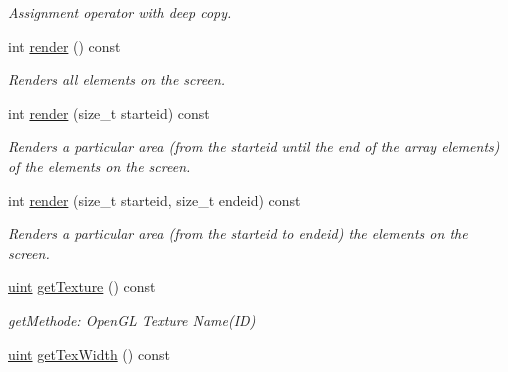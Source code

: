\begin{DoxyCompactItemize}
\begin{DoxyCompactList}\small\item\em Assignment operator with deep copy. \item\end{DoxyCompactList}\item 
int \hyperlink{class_f2_c_1_1_array_sprite_a3dc5b27cc09b3ee7b2817e5503ab0678}{render} () const 
\begin{DoxyCompactList}\small\item\em Renders all elements on the screen. \item\end{DoxyCompactList}\item 
int \hyperlink{class_f2_c_1_1_array_sprite_a7324125437c987b7fe0965f76deca762}{render} (size\_\-t starteid) const 
\begin{DoxyCompactList}\small\item\em Renders a particular area (from the starteid until the end of the array elements) of the elements on the screen. \item\end{DoxyCompactList}\item 
int \hyperlink{class_f2_c_1_1_array_sprite_a76b3b457b6fdabffc841b718d52078af}{render} (size\_\-t starteid, size\_\-t endeid) const 
\begin{DoxyCompactList}\small\item\em Renders a particular area (from the starteid to endeid) the elements on the screen. \item\end{DoxyCompactList}\item 
\hypertarget{class_f2_c_1_1_array_sprite_a427b2c19fa1f6869fee1468644789bec}{
\hyperlink{namespace_f2_c_a58be2bac9eb3e3c99cb41b6008bf4fae}{uint} \hyperlink{class_f2_c_1_1_array_sprite_a427b2c19fa1f6869fee1468644789bec}{getTexture} () const }
\label{class_f2_c_1_1_array_sprite_a427b2c19fa1f6869fee1468644789bec}

\begin{DoxyCompactList}\small\item\em getMethode: OpenGL Texture Name(ID) \item\end{DoxyCompactList}\item 
\hypertarget{class_f2_c_1_1_array_sprite_a2f9d459bba7bb2f5fe107d21bcb46b8c}{
\hyperlink{namespace_f2_c_a58be2bac9eb3e3c99cb41b6008bf4fae}{uint} \hyperlink{class_f2_c_1_1_array_sprite_a2f9d459bba7bb2f5fe107d21bcb46b8c}{getTexWidth} () const }
\label{class_f2_c_1_1_array_sprite_a2f9d459bba7bb2f5fe107d21bcb46b8c}


\end{DoxyCompactItemize}
